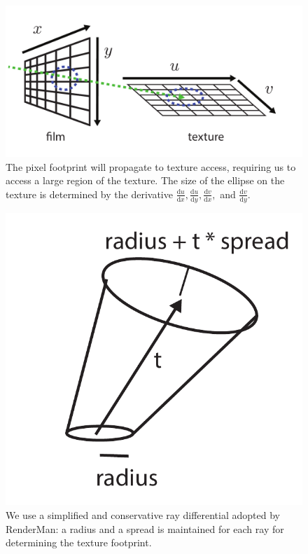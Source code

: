 \begin{figure}
    \centering
    \includegraphics[width=0.4\linewidth]{imgs/texture_filtering.pdf}
    \caption{The pixel footprint will propagate to texture access, requiring us to access a large region of the texture. The size of the ellipse on the texture is determined by the derivative $\frac{\mathrm{d}u}{\mathrm{d}x}, \frac{\mathrm{d}u}{\mathrm{d}y}, \frac{\mathrm{d}v}{\mathrm{d}x},$ and $\frac{\mathrm{d}v}{\mathrm{d}y}$.}
    \label{fig:texture_filtering}
\end{figure}

\begin{figure}
    \centering
    \includegraphics[width=0.3\linewidth]{imgs/ray_differential.pdf}
    \caption{We use a simplified and conservative ray differential adopted by RenderMan: a radius and a spread is maintained for each ray for determining the texture footprint.}
    \label{fig:ray_differential}
\end{figure}

